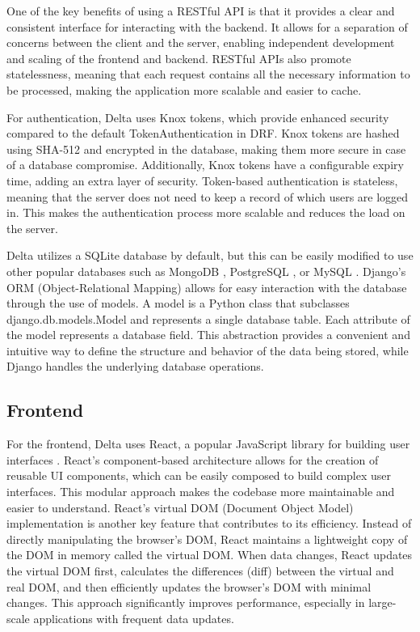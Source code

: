 \documentclass[conference]{IEEEtran}
\begin{document}
One of the key benefits of using a RESTful API is that it provides a clear and consistent interface for interacting with the backend. It allows for a separation of concerns between the client and the server, enabling independent development and scaling of the frontend and backend. RESTful APIs also promote statelessness, meaning that each request contains all the necessary information to be processed, making the application more scalable and easier to cache.

For authentication, Delta uses Knox tokens, which provide enhanced security compared to the default TokenAuthentication in DRF. Knox tokens are hashed using SHA-512 and encrypted in the database, making them more secure in case of a database compromise. Additionally, Knox tokens have a configurable expiry time, adding an extra layer of security. Token-based authentication is stateless, meaning that the server does not need to keep a record of which users are logged in. This makes the authentication process more scalable and reduces the load on the server.

Delta utilizes a SQLite database by default, but this can be easily modified to use other popular databases such as MongoDB \cite{mongodb}, PostgreSQL \cite{postgresql}, or MySQL \cite{mysql}. Django's ORM (Object-Relational Mapping) allows for easy interaction with the database through the use of models. A model is a Python class that subclasses django.db.models.Model and represents a single database table. Each attribute of the model represents a database field. This abstraction provides a convenient and intuitive way to define the structure and behavior of the data being stored, while Django handles the underlying database operations.

\subsection{Frontend}
For the frontend, Delta uses React, a popular JavaScript library for building user interfaces \cite{react}. React's component-based architecture allows for the creation of reusable UI components, which can be easily composed to build complex user interfaces. This modular approach makes the codebase more maintainable and easier to understand. React's virtual DOM (Document Object Model) implementation is another key feature that contributes to its efficiency. Instead of directly manipulating the browser's DOM, React maintains a lightweight copy of the DOM in memory called the virtual DOM. When data changes, React updates the virtual DOM first, calculates the differences (diff) between the virtual and real DOM, and then efficiently updates the browser's DOM with minimal changes. This approach significantly improves performance, especially in large-scale applications with frequent data updates.
\end{document}
